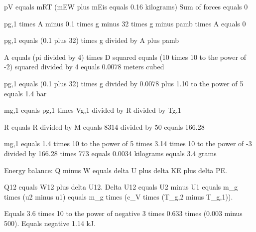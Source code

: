 pV equals mRT  
(mEW plus mEis equals 0.16 kilograms)  
Sum of forces equals 0  

pg,1 times A minus 0.1 times g minus 32 times g minus pamb times A equals 0  

pg,1 equals (0.1 plus 32) times g divided by A plus pamb  

A equals (pi divided by 4) times D squared equals (10 times 10 to the power of -2) squared divided by 4 equals 0.0078 meters cubed  

pg,1 equals (0.1 plus 32) times g divided by 0.0078 plus 1.10 to the power of 5 equals 1.4 bar  

mg,1 equals pg,1 times Vg,1 divided by R divided by Tg,1  

R equals R divided by M equals 8314 divided by 50 equals 166.28  

mg,1 equals 1.4 times 10 to the power of 5 times 3.14 times 10 to the power of -3 divided by 166.28 times 773 equals 0.0034 kilograms equals 3.4 grams

Energy balance:  
Q minus W equals delta U plus delta KE plus delta PE.  

Q12 equals W12 plus delta U12.  
Delta U12 equals U2 minus U1 equals m_g times (u2 minus u1) equals m_g times (c_V times (T_g,2 minus T_g,1)).  

Equals 3.6 times 10 to the power of negative 3 times 0.633 times (0.003 minus 500).  
Equals negative 1.14 kJ.